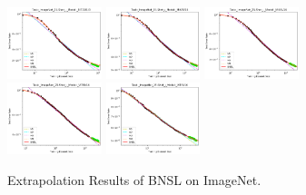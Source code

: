 \documentclass{article} %
\begin{document}
\begin{figure}
\includegraphics[width=0.245\textwidth]{figures/scaling_laws_benchmark_dataset_plots__all_functional_forms/few_shot_25___BiT_101_3.png}
\includegraphics[width=0.245\textwidth]{figures/scaling_laws_benchmark_dataset_plots__all_functional_forms/few_shot_25___MiX_B_16.png}
\includegraphics[width=0.245\textwidth]{figures/scaling_laws_benchmark_dataset_plots__all_functional_forms/few_shot_25___MiX_L_16.png}
\includegraphics[width=0.245\textwidth]{figures/scaling_laws_benchmark_dataset_plots__all_functional_forms/few_shot_25___ViT_B_16.png}
\includegraphics[width=0.245\textwidth]{figures/scaling_laws_benchmark_dataset_plots__all_functional_forms/few_shot_25___ViT_S_16.png}

    \caption{
    Extrapolation Results of BNSL on ImageNet.
    }
    \label{fig:scaling_laws_benchmark_dataset_all_extrapolations__ImageNet}
\end{figure}
\end{document}
